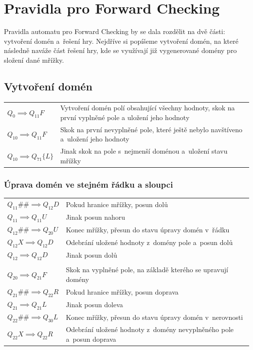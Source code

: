 \section{Pravidla pro Forward Checking}

Pravidla automatu pro Forward Checking by se dala rozdělit na dvě části:
vytvoření domén a~řešení hry. Nejdříve si popíšeme vytvoření domén, na které
následně naváže část řešení hry, kde se využívají již vygenerované domény pro
složení dané mřížky.

\subsection{Vytvoření domén}

\begin{tabular}{@{}p{4cm} p{10.5cm}@{}}
    \(Q_0 \implies Q_{11}F\) & Vytvoření domén polí obsahující všechny hodnoty,
        skok na první vyplněné pole a uložení jeho hodnoty \\
    \(Q_{10} \implies Q_{11}F\) & Skok na první nevyplněné pole, které ještě
        nebylo navštíveno a~uložení jeho hodnoty \\
    \(Q_{10} \implies Q_{71}\{L\}\) & Jinak skok na pole s~nejmenší doménou
        a~uložení stavu mřížky \\

\end{tabular}

\subsubsection*{Úprava domén ve stejném řádku a sloupci}
\begin{tabular}{@{}p{4cm} p{10.5cm}@{}}
    \(Q_{11}\#\# \implies Q_{12}D\) & Pokud hranice mřížky, posun dolů \\
    \(Q_{11} \implies Q_{11}U\) & Jinak posun nahoru \\
    \(Q_{12}\#\# \implies Q_{20}U\) & Konec mřížky, přesun do stavu úpravy
        domén v~řádku \\
    \(Q_{12}X \implies Q_{12}D\) & Odebrání uložené hodnoty z~domény pole
        a~posun dolů \\
    \(Q_{12} \implies Q_{12}D\) & Jinak posun dolů \\

    & \\
    \(Q_{20} \implies Q_{21}F\) & Skok na vyplněné pole, na základě kterého se
        upravují domény \\
    \(Q_{21}\#\# \implies Q_{22}R\) & Pokud hranice mřížky, posun doprava \\
    \(Q_{21} \implies Q_{21}L\) & Jinak posun doleva \\
    \(Q_{22}\#\# \implies Q_{30}L\) & Konec mřížky, přesun do stavu úpravy
        domén v~nerovnosti \\
    \(Q_{22}X \implies Q_{22}R\) & Odebrání uložené hodnoty z~domény
        nevyplněného pole a~posun doprava \\
\end{tabular}

